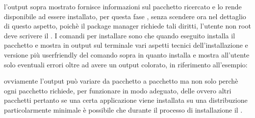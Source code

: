l'output sopra mostrato fornisce informazioni sul pacchetto ricercato e lo rende disponibile ad essere installato, per questa fase , senza scendere ora nel dettaglio di questo aspetto, poichè il package manager richiede tali diritti, l'utente non root deve scrivere il . I comandi per installare sono  che quando eseguito installa il pacchetto e mostra in output sul terminale vari aspetti tecnici dell'installazione e  versione più userfriendly del comando sopra in quanto installa e mostra all'utente solo eventuali errori oltre ad avere un output colorato, in riferimento all'esempio:

ovviamente l'output può variare da pacchetto a pacchetto ma non solo perchè ogni pacchetto richiede, per funzionare in modo adeguato, delle  ovvero altri pacchetti pertanto se una certa applicazione viene installata su una distribuzione particolarmente minimale è possibile che durante il processo di installazione il .

